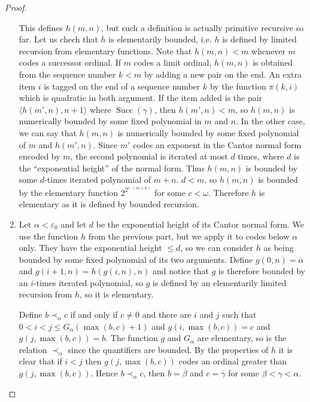 \documentclass[8pt]{article}
\theoremstyle{definition}
\theoremstyle{definition}
\theoremstyle{definition}
\theoremstyle{definition}
\theoremstyle{definition}
\theoremstyle{definition}
\theoremstyle{definition}
\theoremstyle{definition}
\theoremstyle{definition}
\theoremstyle{definition}
\theoremstyle{definition}
\theoremstyle{definition}
\theoremstyle{definition}
\theoremstyle{question}
\begin{document}
\begin{proof}
\begin{enumerate}
    This defines $h(m,n)$, but such a definition is actually primitive recursive so far. Let us chech that $h$ is
    elementarily bounded, i.e. $h$ is defined by limited recursion from elementary functions.
    Note that $h(m, n) < m$ whenever $m$ codes a successor ordinal. If $m$ codes a limit ordinal, 
    $h(m,n)$ is obtained from the sequence number $k < m$ by adding a new pair on the end.
    An extra item $i$ is tagged on the end of a sequence number $k$ by the function $\pi(k, i)$ which is quadratic in both argument.
    If the item added is the pair $\langle h(m', n), n + 1 \rangle$ where $\operatorname{Succ}(\gamma)$,
    then $h(m', n) < m$, so $h(m, n)$ is numerically bounded by some fixed polynomial in $m$ and $n$.
    In the other case, we can say that $h(m, n)$ is numerically bounded by some fixed polynomial of $m$ and $h(m',n)$.
    Since $m'$ codes an exponent in the Cantor normal form encoded by $m$, the second polynomial
    is iterated at most $d$ times, where $d$ is the ``exponential height'' of the normal form.
    Thus $h(m, n)$ is bounded by some $d$-times iterated polynomial of $m + n$.
    $d < m$, so $h(m, n)$ is bounded by the elementary function $2^{2^{c \cdot (m + n)}}$ for some $c < \omega$.
    Therefore $h$ is elementary as it is defined by bounded recursion.
    \item Let $\alpha < \varepsilon_0$ and let $d$ be the exponential height of its Cantor normal form.
    We use the function $h$ from the previous part, but we apply it to codes below $\alpha$ only. They have the exponential
    height $\leq d$, so we can consider $h$ as being bounded by some fixed polynomial of its two arguments.
    Define $g(0, n) = \overline{\alpha}$ and $g(i+1,n) = h(g(i, n), n)$ and notice that $g$ is therefore bounded by an $i$-times iterated polynomial,
    so $g$ is defined by an elementarily limited recursion from $h$, so it is elementary.
    
    Define $b \prec_{\alpha} c$ if and only if $c \neq 0$ and there are $i$ and $j$ such that 
    $0 < i < j \leq G_{\alpha}(\max(b, c) + 1)$ and $g(i, \max(b,c)) = c$ and $g(j, \max(b,c)) = b$.
    The function $g$ and $G_{\alpha}$ are elementary, so is the relation $\prec_{\alpha}$ since the quantifiers are
    bounded. By the properties of $h$ it is clear that if $i < j$ then $g(j, \max(b,c))$ codes an ordinal greater than 
    $g(j, \max(b,c))$. Hence $b \prec_{\alpha} c$, then $b = \overline{\beta}$ and $c = \overline{\gamma}$ for some
    $\beta < \gamma < \alpha$.


\end{enumerate}
\end{proof}
\end{document}
